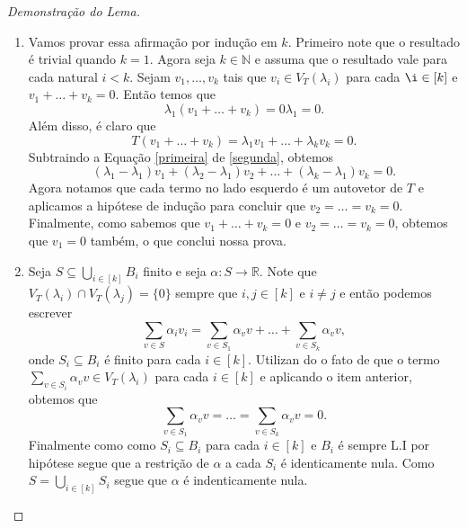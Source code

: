 \documentclass[11pt,twoside,a4paper]{book}
\begin{document}
\begin{proof}[Demonstração do Lema]\hfill
\begin{enumerate}
\item Vamos provar essa afirmação por indução em \(k\). Primeiro note que o
      resultado é trivial quando \(k=1\). Agora seja \(k\in\mathbb{N}\) e
      assuma  que o resultado vale para cada natural \(i < k\). Sejam
      \(v_1,\ldots,v_k\) tais que \(v_i\in V_T(\lambda_i)\) para cada \(\i\in
      [k]\) e \(v_1+\ldots + v_k=0\). Então temos que 
      \begin{equation}\label{primeira}
      \lambda_1(v_1+\ldots+v_k)=0\lambda_1=0.
    \end{equation}
    Além disso, é claro que
      \begin{equation}\label{segunda}
      T(v_1+\ldots +v_k)=\lambda_1v_1+\ldots +\lambda_kv_k=0.
      \end{equation}
      Subtraindo a Equação \ref{primeira} de \ref{segunda}, obtemos
      \begin{equation}\label{terceira}
       (\lambda_1-\lambda_1)v_1+(\lambda_2-\lambda_1)v_2+\ldots +(\lambda_k-\lambda_1)v_k=0.
     \end{equation}
     Agora notamos que cada termo no lado esquerdo é um autovetor de \(T\)     e
     aplicamos a hipótese de indução para concluir que \(v_2=\ldots =v_k=0
     \). Finalmente, como sabemos que \(v_1+\ldots +v_k=0\) e \(v_2=\ldots =
     v_k=0\), obtemos que \(v_1=0\) também, o que conclui nossa prova.
     \item Seja \(S\subseteq\bigcup_{i\in [k]}B_i\) finito e seja \(\alpha\colon S\to\mathbb{R}\). Note que
       \(V_T(\lambda_i)\cap V_T(\lambda_j)=\{0\}\) sempre que \(i,j\in [k]\) e
       \(i\not=j\) e então podemos escrever
       \[\sum_{v\in S}\alpha_iv_i=\sum_{v\in S_1}\alpha_v v+\ldots+\sum_{v\in
           S_k}\alpha_vv,\]
       onde \(S_i\subseteq B_i\) é finito para cada \(i\in [k]\). Utilizan
       do o fato de que o termo \mbox{\(\sum_{v\in S_i}\alpha_v v\in V_T(\lambda_i)\)}
       para cada \(i\in [k]\) e aplicando o item anterior, obtemos que
       \[\sum_{v\in S_1}\alpha_vv=\ldots=\sum_{v\in S_k}\alpha_vv=0.\]
       Finalmente como como \(S_i\subseteq B_i\) para cada \(i\in [k]\) e
       \(B_i\) é sempre L.I por hipótese segue que a restrição de \(\alpha\) a
       cada \(S_i\) é identicamente nula. Como \(S=\bigcup_{i\in [k]}S_i\) segue
       que \(\alpha\) é indenticamente nula.\qedhere
    \end{enumerate}
\end{proof}
\end{document}
